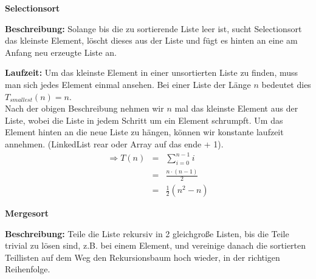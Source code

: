 \documentclass[11pt,a4paper,ngerman]{article}
\begin{document}
\begin{description}

\item{\bfseries Selectionsort}

\begin{description}

\item{\bfseries Beschreibung:} Solange bis die zu sortierende Liste leer ist, sucht Selectionsort das kleinste Element, löscht dieses aus der Liste und fügt es hinten an eine am Anfang neu erzeugte Liste an.

\item{\bfseries Laufzeit:} Um das kleinste Element in einer unsortierten Liste zu finden, muss man sich jedes Element einmal ansehen. Bei einer Liste der Länge $n$ bedeutet dies $T_{smallest}(n) = n$.\\
Nach der obigen Beschreibung nehmen wir $n$ mal das kleinste Element aus der Liste, wobei die Liste in jedem Schritt um ein Element schrumpft. Um das Element hinten an die neue Liste zu hängen, können wir konstante laufzeit annehmen. (LinkedList rear oder Array auf das ende + 1).\\
$$
\begin{array}{rcl}
\Rightarrow T(n) &=& \sum_{i=0}^{n-1} i \\
&=& \frac{n\cdot (n-1)}{2} \\
&=& \frac{1}{2} \left( n^2 - n \right)
\end{array}
$$

\end{description}

\item{\bfseries Mergesort}

\begin{description}

\item{\bfseries Beschreibung:} Teile die Liste rekursiv in 2 gleichgroße Listen, bis die Teile trivial zu lösen sind, z.B. bei einem Element, und vereinige danach die sortierten Teillisten auf dem Weg den Rekursionsbaum hoch wieder, in der richtigen Reihenfolge.


\end{description}
\end{description}
\end{document}
